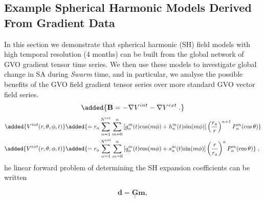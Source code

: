 \documentclass[extra,mreferee]{gji}
\begin{document}
\subsection{Example Spherical Harmonic Models Derived From Gradient Data}
\label{sec:5.2}
In this section we demonstrate that spherical harmonic (SH) field models with high temporal resolution (4 months) can be built from the global network of GVO gradient tensor time series. We then use these models to investigate global change in SA during {\it Swarm} time, and in particular, we analyse the possible benefits of the GVO field gradient tensor series over more standard GVO vector field series.
 \citep[e.g.][]{Sabaka_etal_2010} 
\begin{equation}
\added{\mathbf{B} = -\nabla V^{int} - \nabla V^{ext} \;.} \label{eq:POT_int_ext}     
\end{equation}
\begin{align}
\added{V^{int}(r,\theta,\phi,t) }  &\added{= r_a \sum_{n=1}^{N^{int}} \sum_{m=0}^{n} \left[ g_n^m(t) \mathrm{cos}(m\phi) +h_n^m(t) \mathrm{sin}(m\phi) \right] \left(\frac{r_a}{r}\right)^{n+1} P_n^m(\mathrm{cos}\,\theta) }  \label{eq:V_int} \\
\added{V^{ext}(r,\theta,\phi,t)}  &\added{= r_a \sum_{n=1}^{N^{ext}} \sum_{m=0}^{n} \left[ q_n^m(t) \mathrm{cos}(m\phi) +s_n^m(t) \mathrm{sin}(m\phi) \right] \left(\frac{r}{r_a}\right)^{n} P_n^m(\mathrm{cos}\,\theta) } \;,  \label{eq:V_ext}  
\end{align}
 he linear forward problem of determining the SH expansion coefficients can be written

\begin{equation}
\mathbf{d} = \underline{\underline{\mathbf{G}}} \mathbf{m}, \label{eq:10}
\end{equation}
\end{document}
